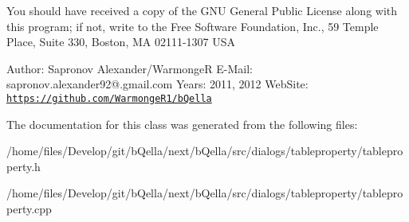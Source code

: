 You should have received a copy of the GNU General Public License along with this program; if not, write to the Free Software Foundation, Inc., 59 Temple Place, Suite 330, Boston, MA 02111-\/1307 USA

Author: Sapronov Alexander/WarmongeR E-\/Mail: sapronov.alexander92@.gmail.com Years: 2011, 2012 WebSite: \href{https://github.com/WarmongeR1/bQella}{\tt https://github.com/WarmongeR1/bQella} 

The documentation for this class was generated from the following files:\begin{DoxyCompactItemize}
\item 
/home/files/Develop/git/bQella/next/bQella/src/dialogs/tableproperty/tableproperty.h\item 
/home/files/Develop/git/bQella/next/bQella/src/dialogs/tableproperty/tableproperty.cpp\end{DoxyCompactItemize}
